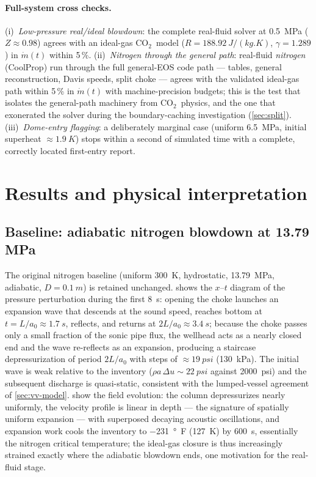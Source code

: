 \documentclass[11pt]{article}
\newcommand{\mdot}{\dot{m}}
\newcommand{\co}{CO$_2$}
\begin{document}
\paragraph{Full-system cross checks.} (i)~\emph{Low-pressure
real/ideal blowdown}: the complete real-fluid solver at
\SI{0.5}{MPa} ($Z \approx 0.98$) agrees with an ideal-gas \co\ model
($R = \SI{188.92}{J/(kg.K)}$, $\gamma = 1.289$) in $\mdot(t)$ within
5\,\%. (ii)~\emph{Nitrogen through the general path}: real-fluid
\emph{nitrogen} (CoolProp) run through the full general-EOS code path
--- tables, general reconstruction, Davis speeds, split choke ---
agrees with the validated ideal-gas path within 5\,\% in $\mdot(t)$
with machine-precision budgets; this is the test that isolates the
general-path machinery from \co\ physics, and the one that exonerated
the solver during the boundary-caching investigation
(\cref{sec:split}). (iii)~\emph{Dome-entry flagging}: a
deliberately marginal case (uniform \SI{6.5}{MPa}, initial superheat
$\approx\SI{1.9}{K}$) stops within a second of simulated time with a
complete, correctly located first-entry report.

\section{Results and physical interpretation}
\label{sec:results}

\subsection{Baseline: adiabatic nitrogen blowdown at 13.79 MPa}
\label{sec:results-n2}

The original nitrogen baseline (uniform \SI{300}{K}, hydrostatic,
\SI{13.79}{MPa}, adiabatic, $D = \SI{0.1}{m}$) is retained unchanged.
 shows the $x$--$t$ diagram of the pressure perturbation
during the first \SI{8}{s}: opening the choke launches an expansion
wave that descends at the sound speed, reaches bottom at
$t = L/a_0 \approx \SI{1.7}{s}$, reflects, and returns at
$2L/a_0 \approx \SI{3.4}{s}$; because the choke passes only a small
fraction of the sonic pipe flux, the wellhead acts as a nearly closed
end and the wave re-reflects as an expansion, producing a staircase
depressurization of period $2L/a_0$ with steps of
${\approx}\SI{19}{psi}$ (\SI{130}{kPa}). The initial wave is weak
relative to the inventory ($\rho a\,\Delta u \sim \SI{22}{psi}$
against \SI{2000}{psi}) and the subsequent discharge is quasi-static,
consistent with the lumped-vessel agreement of \cref{sec:vv-model}.
 show the field evolution: the
column depressurizes nearly uniformly, the velocity profile is linear
in depth --- the signature of spatially uniform expansion --- with
superposed decaying acoustic oscillations, and expansion work cools
the inventory to \SI{-231}{\degree F} (\SI{127}{K}) by \SI{600}{s},
essentially the nitrogen
critical temperature; the ideal-gas closure is thus increasingly
strained exactly where the adiabatic blowdown ends, one motivation
for the real-fluid stage.
\end{document}
